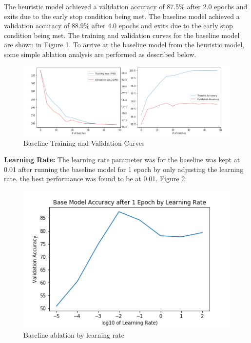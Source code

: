 \documentclass[a4paper,10pt]{article}
\begin{document}
\par
\justify
The heuristic model achieved a validation accuracy of 87.5\% after 2.0 epochs and exits due to the early stop condition being met. The baseline model achieved a validation accuracy of 88.9\% after 4.0 epochs and exits due to the early stop condition being met. The training and validation curves for the baseline model are shown in Figure \ref{fig:trainvalcurves}. To arrive at the baseline model from the heuristic model, some simple ablation analysis are performed as described below.

\begin{figure}[h]
    \centering
    \includegraphics[scale=0.4]{trainvalcurves}
    \caption{Baseline Training and Validation Curves}
    \label{fig:trainvalcurves}
\end{figure}

\par
\justify
\textbf{Learning Rate:} The learning rate parameter was for the baseline was kept at 0.01 after running the baseline model for 1 epoch by only adjusting the learning rate. the best performance was found to be at 0.01. Figure \ref{fig:lrexplore}


\begin{figure}[h]
    \centering
    \includegraphics[scale=0.4]{lr_explore}
    \caption{Baseline ablation by learning rate}
    \label{fig:lrexplore}
\end{figure}
\end{document}
